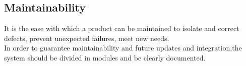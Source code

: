 \subsection{Maintainability}

It is the ease with which a product can be maintained to isolate and correct defects, prevent unexpected failures, meet new needs.\\
In order to guarantee maintainability and future updates and integration,the system should be divided in modules and be clearly documented.
